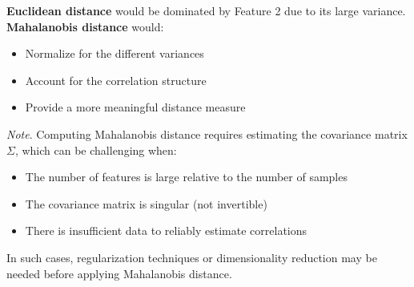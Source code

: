 \documentclass[a4paper]{article}
\theoremstyle{definition}
\begin{document}
\textbf{Euclidean distance} would be dominated by Feature 2 due to its large variance.
\vspace{1em}
\noindent
\newline
\textbf{Mahalanobis distance} would:
\begin{itemize}
    \item Normalize for the different variances 
    \item Account for the correlation structure 
    \item Provide a more meaningful distance measure
\end{itemize}
\textit{Note}. Computing Mahalanobis distance requires estimating the covariance matrix \( \Sigma \), which can be challenging when:
\begin{itemize}
    \item The number of features is large relative to the number of samples 
    \item The covariance matrix is singular (not invertible)
    \item There is insufficient data to reliably estimate correlations
\end{itemize}
In such cases, regularization techniques or dimensionality reduction may be needed before applying Mahalanobis distance.
\end{document}
